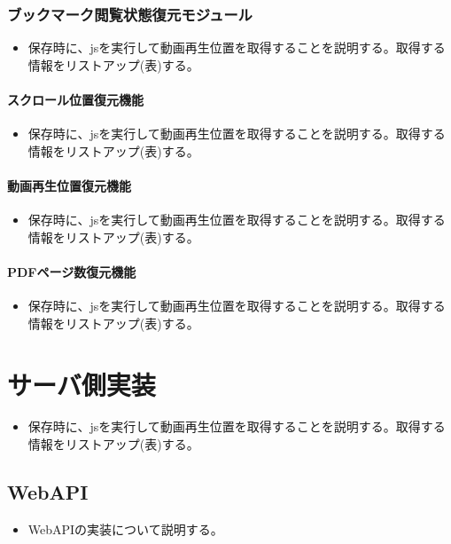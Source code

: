 \subsubsection{ブックマーク閲覧状態復元モジュール}
\begin{itemize}
  \item 保存時に、jsを実行して動画再生位置を取得することを説明する。取得する情報をリストアップ(表)する。
\end{itemize}

\paragraph{スクロール位置復元機能}
\begin{itemize}
  \item 保存時に、jsを実行して動画再生位置を取得することを説明する。取得する情報をリストアップ(表)する。
\end{itemize}

\paragraph{動画再生位置復元機能}
\begin{itemize}
  \item 保存時に、jsを実行して動画再生位置を取得することを説明する。取得する情報をリストアップ(表)する。
\end{itemize}

\paragraph{PDFページ数復元機能}
\begin{itemize}
  \item 保存時に、jsを実行して動画再生位置を取得することを説明する。取得する情報をリストアップ(表)する。
\end{itemize}

\section{サーバ側実装}
\begin{itemize}
  \item 保存時に、jsを実行して動画再生位置を取得することを説明する。取得する情報をリストアップ(表)する。
\end{itemize}

\subsection{WebAPI}
\begin{itemize}
  \item WebAPIの実装について説明する。
\end{itemize}

